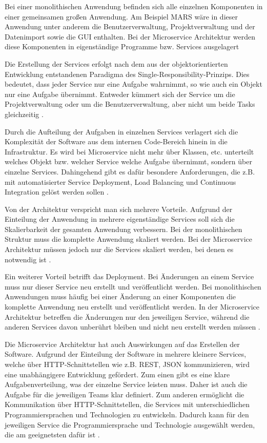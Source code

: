 \documentclass{llncs}
\begin{document}
Bei einer monolithischen Anwendung befinden sich alle einzelnen Komponenten in einer gemeinsamen großen Anwendung. Am Beispiel MARS wäre in dieser Anwendung unter anderem die Benutzerverwaltung, Projektverwaltung und der Datenimport sowie die GUI enthalten. Bei der Microservice Architektur werden diese Komponenten in eigenständige Programme bzw. Services ausgelagert

Die Erstellung der Services erfolgt nach dem aus der objektorientierten Entwicklung entstandenen Paradigma des Single-Responsibility-Prinzips. Dies bedeutet, dass jeder Service nur eine Aufgabe wahrnimmt, so wie auch ein Objekt nur eine Aufgabe übernimmt. Entweder kümmert sich der Service um die Projektverwaltung oder um die Benutzerverwaltung, aber nicht um beide Tasks gleichzeitig \cite{fowler2014, savchenko2015, savchenko2015microservices}.

Durch die Aufteilung der Aufgaben in einzelnen Services verlagert sich die Komplexität der Software aus dem internen Code-Bereich hinein in die Infrastruktur. Es wird bei Microservice nicht mehr über Klassen, etc. unterteilt welches Objekt bzw. welcher Service welche Aufgabe übernimmt, sondern über einzelne Services. Dahingehend gibt es dafür besondere Anforderungen, die z.B. mit automatisierter Service Deployment, Load Balancing und Continuous Integration gelöst werden sollen \cite{savchenko2015, Fowler2014testing}. 

Von der Architektur verspricht man sich mehrere Vorteile. Aufgrund der Einteilung der Anwendung in mehrere eigenständige Services soll sich die Skalierbarkeit der gesamten Anwendung verbessern. Bei der monolithischen Struktur muss die komplette Anwendung skaliert werden. Bei der Microservice Architektur müssen jedoch nur die Services skaliert werden, bei denen es notwendig ist \cite{fowler2014}. 

Ein weiterer Vorteil betrifft das Deployment. Bei Änderungen an einem Service muss nur dieser Service neu erstellt und veröffentlicht werden. Bei monolithischen Anwendungen muss häufig bei einer Änderung an einer Komponenten die komplette Anwendung neu erstellt und veröffentlicht werden. In der Microservice Architektur betreffen die Änderungen nur den jeweiligen Service, während die anderen Services davon unberührt bleiben und nicht neu erstellt werden müssen \cite{savchenko2015, savchenko2015microservices}. 

Die Microservice Architektur hat auch Auswirkungen auf das Erstellen der Software. Aufgrund der Einteilung der Software in mehrere kleinere Services, welche über HTTP-Schnittstellen wie z.B. REST, JSON kommunizieren, wird eine unabhängigere Entwicklung gefördert. Zum einen gibt es eine klare Aufgabenverteilung, was der einzelne Service leisten muss. Daher ist auch die Aufgabe für die jeweiligen Teams klar definiert. Zum anderen ermöglicht die Kommunikation über HTTP-Schnittstellen, die Services mit unterschiedlichen Programmiersprachen und Technologien zu entwickeln. Dadurch kann für den jeweiligen Service die Programmiersprache und Technologie ausgewählt werden, die am geeignetsten dafür ist \cite{savchenko2015microservices, Ford_2016}.
\end{document}

